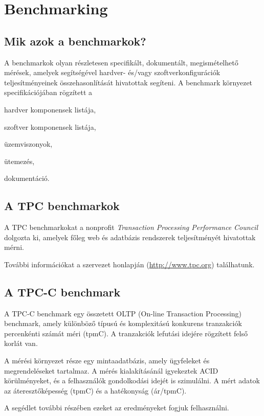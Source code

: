 \documentclass[a4paper,10pt,titlepage]{article}
\newenvironment{sajat_itemize}
{
	\begin{itemize}
	\setlength{\itemsep}{0pt}
}
{
	\end{itemize}
}
\begin{document}
\section{Benchmarking}
\subsection{Mik azok a benchmarkok?}

A benchmarkok olyan részletesen specifikált, dokumentált, megismételhető mérések, amelyek segítségével hardver- és/vagy szoftverkonfigurációk teljesítményeinek összehasonlítását hivatottak segíteni. A benchmark környezet specifikációjában rögzített a

\begin{sajat_itemize}
\item hardver komponensek listája,
\item szoftver komponensek listája,
\item üzemviszonyok,
\item ütemezés,
\item dokumentáció.
\end{sajat_itemize} 

\subsection{A TPC benchmarkok}
A TPC benchmarkokat a nonprofit \textit{Transaction Processing Performance Council} dolgozta ki, amelyek főleg web és adatbázis rendszerek teljesítményét hivatottak mérni.

További információkat a szervezet honlapján (\url{http://www.tpc.org}) találhatunk.

\subsection{A TPC-C benchmark}
A TPC-C benchmark egy összetett OLTP (On-line Transaction Processing) benchmark, amely különböző típusú és komplexitású konkurens tranzakciók percenkénti számát méri (tpmC). A tranzakciók lefutási idejére rögzített felső korlát van.

A mérési környezet része egy mintaadatbázis, amely ügyfeleket és megrendeléseket tartalmaz. A mérés kialakításánál igyekeztek ACID körülményeket, és a felhasználók gondolkodási idejét is szimulálni. A mért adatok az áteresztőképesség (tpmC) és a hatékonyság (ár/tpmC). 

A segédlet további részében ezeket az eredményeket fogjuk felhasználni.
 
\end{document}
